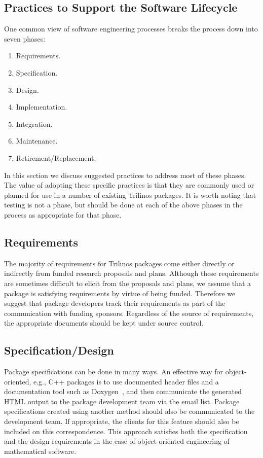 \documentclass[12pt,relax]{TrilinosDevGuide}
\begin{document}
\subsection{Practices to Support the Software Lifecycle}

One common view of software engineering processes breaks the process down into 
seven phases:
\begin{enumerate}
\item Requirements.
\item Specification.
\item Design.
\item Implementation.
\item Integration.
\item Maintenance.
\item Retirement/Replacement.
\end{enumerate}
In this section we discuss suggested practices to address most of these 
phases.  The value of adopting these specific practices is that they are 
commonly used or planned for use in a number of existing Trilinos packages.  
It is worth noting that testing is not a phase, but should be done at each 
of the above phases in the process as appropriate for that phase.

\subsection{Requirements}
The majority of requirements for Trilinos packages come either directly or 
indirectly from funded research proposals and plans.  Although these 
requirements are sometimes difficult to elicit from the proposals and plans, 
we assume that a package is satisfying requirements by virtue of being 
funded.  Therefore we suggest that package developers track their 
requirements as part of the communication with funding sponsors.
Regardless of the source of requirements, the appropriate documents
should be kept under source control.

\subsection{Specification/Design}
Package specifications can be done in many ways.  An effective way for 
object-oriented, e.g., C++ packages is to use documented header files and a 
documentation tool such as Doxygen~\cite{Doxygen}, and then communicate the 
generated HTML output to the package development team via the \newline
{} email list.  
Package specifications created using another method should also be 
communicated to the development team.  If
appropriate, the clients for this feature should also be included on
this correspondence.  This
approach satisfies both the specification and the design requirements
in the case of object-oriented engineering of mathematical software.
\end{document}
